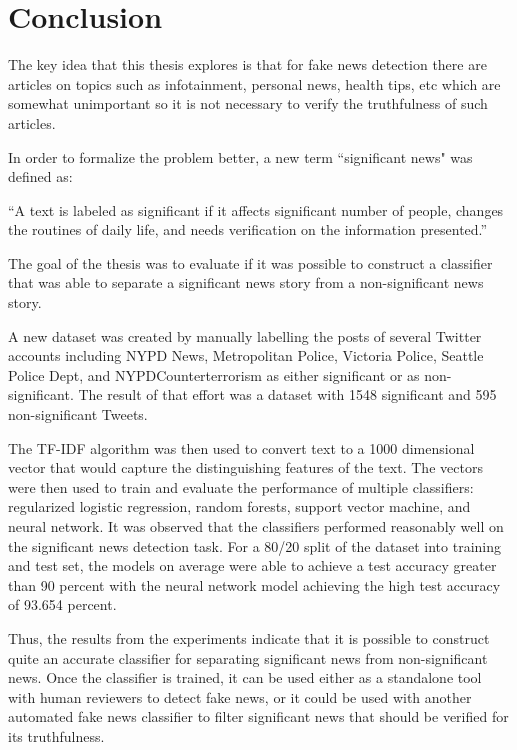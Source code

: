 \chapter{Conclusion}\label{conclusion}
The key idea that this thesis explores is that for fake news detection there are articles on topics such as infotainment, personal news, health tips, etc which are somewhat unimportant so it is not necessary to verify the truthfulness of such articles.

In order to formalize the problem better, a new term ``significant news" was defined as:

\enquote{A text is labeled as significant if it affects significant number of people, changes the routines of daily life, and needs verification on the information presented.}

The goal of the thesis was to evaluate if it was possible to construct a classifier that was able to separate a significant news story from a non-significant news story.

A new dataset was created by manually labelling the posts of several Twitter accounts including NYPD News, Metropolitan Police, Victoria Police, Seattle Police Dept, and NYPDCounterterrorism as either significant or as non-significant. The result of that effort was a dataset with 1548 significant and 595 non-significant Tweets.

The TF-IDF algorithm was then used to convert text to a 1000 dimensional vector that would capture the distinguishing features of the text. The vectors were then used to train and evaluate the performance of multiple classifiers: regularized logistic regression, random forests, support vector machine, and neural network. It was observed that the classifiers performed reasonably well on the significant news detection task. For a 80/20 split of the dataset into training and test set, the models on average were able to achieve a test accuracy greater than 90 percent with the neural network model achieving the high test accuracy of 93.654 percent.

Thus, the results from the experiments indicate that it is possible to construct quite an accurate classifier for separating significant news from non-significant news. Once the classifier is trained, it can be used either as a standalone tool with human reviewers to detect fake news, or it could be used with another automated fake news classifier to filter significant news that should be verified for its truthfulness.

